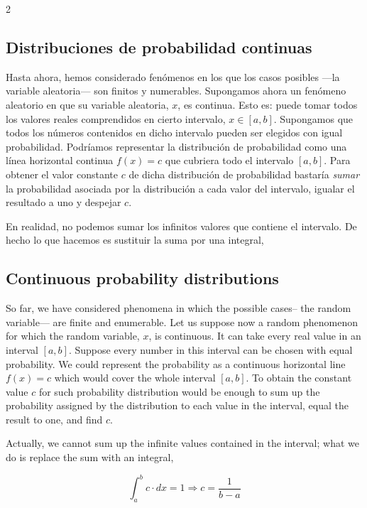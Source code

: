 \begin{paracol}{2}
\subsection{Distribuciones de probabilidad continuas}\label{pdfc}
Hasta ahora, hemos considerado fenómenos en los que los casos posibles ---la variable aleatoria--- son finitos y numerables. Supongamos ahora un fenómeno aleatorio en que su variable aleatoria, $x$, es continua. Esto es: puede tomar todos los valores reales comprendidos en cierto intervalo, $x \in [a,b]$. Supongamos que todos los números contenidos en dicho intervalo pueden ser elegidos con igual probabilidad. Podríamos representar la distribución de probabilidad como una línea horizontal continua $f(x) = c$ que cubriera todo el intervalo $[a,b]$. Para obtener el valor constante $c$ de dicha distribución de probabilidad bastaría \emph{sumar} la probabilidad asociada por la distribución a cada valor del intervalo, igualar el resultado a uno y despejar $c$.

En realidad, no podemos sumar los infinitos valores que contiene el intervalo. De hecho lo que hacemos es sustituir la suma por una integral,
\switchcolumn
\subsection{Continuous probability distributions}
So far, we have considered phenomena in which the possible cases-- the random variable--- are finite and enumerable. Let us suppose now a random phenomenon for which the random variable, $x$, is continuous. It can take every real value in an interval $[a,b]$. Suppose every number in this interval can be chosen with equal probability. We could represent the probability as a continuous horizontal line $f(x) =c$ which would cover the whole interval $[a,b]$. To obtain the constant value $c$ for such probability distribution would be enough to sum up the probability assigned by the distribution to each value in the interval, equal the result to one, and find $c$.

Actually, we cannot sum up the infinite values contained in the interval; what we do is replace the sum with an integral,
\end{paracol}
\begin{equation*}
\int_a^b c\cdot dx = 1 \Rightarrow c = \frac{1}{b-a}
\end{equation*}


